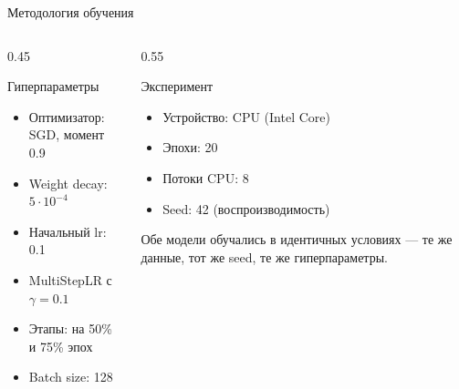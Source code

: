 \documentclass[11pt,aspectratio=169]{beamer}
\begin{document}
\begin{frame}{Методология обучения}
  \begin{columns}[T]
    \begin{column}{0.45\textwidth}
      \begin{block}{Гиперпараметры}
        \begin{itemize}
          \item Оптимизатор: SGD, момент 0.9
          \item Weight decay: \(5 \cdot 10^{-4}\)
          \item Начальный lr: 0.1
          \item MultiStepLR с \(\gamma = 0.1\)
          \item Этапы: на 50\% и 75\% эпох
          \item Batch size: 128
        \end{itemize}
      \end{block}
    \end{column}
    \begin{column}{0.55\textwidth}
      \begin{block}{Эксперимент}
        \begin{itemize}
          \item Устройство: CPU (Intel Core)
          \item Эпохи: 20
          \item Потоки CPU: 8
          \item Seed: 42 (воспроизводимость)
        \end{itemize}
        \vspace{4pt}
        \alert{Обе модели обучались в идентичных условиях} — те же данные,
        тот же seed, те же гиперпараметры.
      \end{block}
    \end{column}
  \end{columns}
\end{frame}
\end{document}
